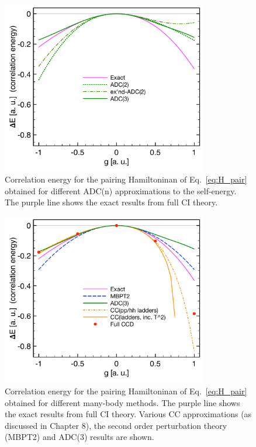 \begin{figure}[ht]
\begin{center}
\includegraphics[width=0.8\textwidth]{Chapter11-figures/Pairing_LNP_scgf.pdf}
\caption{Correlation energy for the pairing Hamiltoninan of Eq.~\eqref{eq:H_pair} obtained for different  ADC(n) approximations
to the self-energy. The purple line shows the exact results from full CI theory. }
\label{fig:pairng_adc}
\end{center}
\end{figure}

\begin{figure}[ht]
\begin{center}
\includegraphics[width=0.8\textwidth]{Chapter11-figures/Pairing_LNP_ALL.pdf}
\caption{Correlation energy for the pairing Hamiltoninan of Eq.~\eqref{eq:H_pair} obtained for different
many-body methods. The purple line shows the exact results from full CI theory. Various CC approximations (as discussed in 
Chapter 8), the  second order perturbation theory (MBPT2)  and ADC(3) results are shown.}
\label{fig:pairng_all}
\end{center}
\end{figure}


